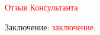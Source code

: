 \documentclass[master, fontsize=12pt]{diploma}
\begin{document}
\fillReviewHeader

\textcolor{red}{Отзыв Консультанта}

Заключение: \textcolor{red}{заключение}.

\makeReviewSignature
\end{document}
